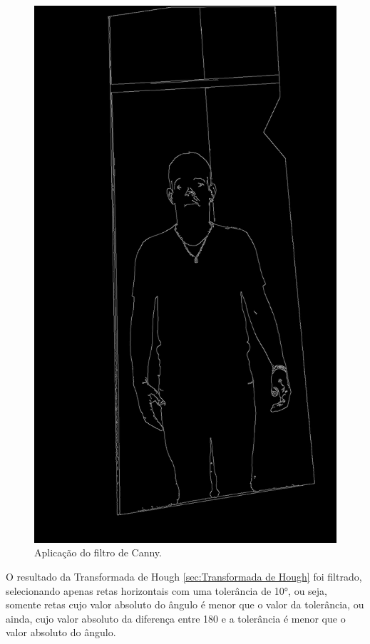 \begin{figure}[htbp]
\begin{minipage}{0.45\textwidth}
            \includegraphics[width=\textwidth]{figuras/filter/canny/canny.png}
        \end{minipage}
    \caption{Aplicação do filtro de Canny.}
    \label{fig:maskCanny}
\end{figure}

O resultado da Transformada de Hough \ref{sec:Transformada de Hough} foi filtrado, selecionando apenas retas horizontais com uma tolerância de 10°, ou seja, somente retas cujo valor absoluto do ângulo é menor que o valor da tolerância, ou ainda, cujo valor absoluto da diferença entre 180 e a tolerância é menor que o valor absoluto do ângulo.

